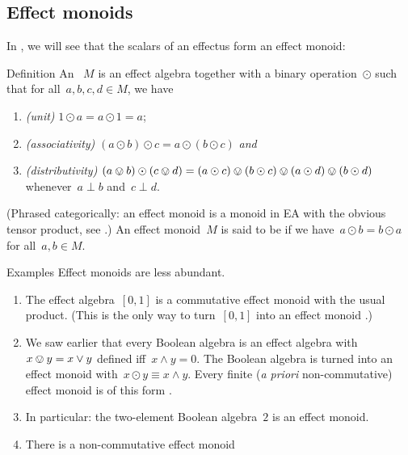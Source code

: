 \documentclass[b]{subfiles}
\begin{document}
\subsection{Effect monoids}
\begin{parsec}%
\begin{point}%
In , we will see that the scalars of an effectus
form an effect monoid:
\end{point}
\begin{point}{Definition}%
An ~$M$ \cite{probdistrconv}
    is an effect algebra
    together with a binary operation~$\odot$
    such that for all~$a,b,c,d \in M$, we have
\begin{enumerate}
    \item \emph{(unit)}
    $1 \odot a = a \odot 1 = a$;
\item \emph{(associativity)}
    $(a \odot b) \odot c 
    =a \odot (b \odot c)$ \emph{and}
\item \emph{(distributivity)}
    $(a \ovee b) \odot (c \ovee d)
            = (a \odot c) \ovee (b \odot c) \ovee
            (a \odot d) \ovee (b \odot d)$
            whenever~$a \perp b$ and~$c \perp d$.
\end{enumerate}
(Phrased categorically:
    an effect monoid is a monoid in \textsf{EA}
    with the obvious tensor product, see \cite{corefl,probdistrconv}.)
An effect monoid~$M$ is said to be 
    if we have~$a\odot b = b\odot a$ for all~$a,b \in M$.
\end{point}
\begin{point}{Examples}%
Effect monoids are less abundant.
\begin{enumerate}
\item The effect algebra~$[0,1]$
        is a commutative effect monoid with the usual product.
        (This is the only way to turn~$[0,1]$ into an effect monoid
                \cite[Prop.~41]{basmsc}.)
\item We saw earlier that every Boolean algebra is an effect algebra
        with~$x \ovee y = x \vee y$ defined iff~$x \wedge y = 0$.
    The Boolean algebra is turned into an effect monoid
        with~$x \odot y \equiv x \wedge y$.
    Every finite (\emph{a priori} non-commutative) effect monoid
    is of this form \cite[Prop.~40]{basmsc}.
\item
In particular: the two-element Boolean algebra~$2$
    is an effect monoid.
\item There is a non-commutative effect monoid

\end{enumerate}
\end{point}
\end{parsec}
\end{document}
